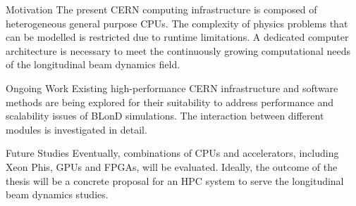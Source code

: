 \begin{frame}
	\begin{block}{Motivation}
		The present CERN computing infrastructure is composed of heterogeneous general purpose CPUs. The complexity of physics problems that can be modelled is restricted due to runtime limitations. A dedicated computer architecture is necessary to meet the continuously growing computational needs of the longitudinal beam dynamics field.
	\end{block}

	\begin{block}{Ongoing Work}
		Existing high-performance CERN infrastructure and software methods are being explored for their suitability to address performance and scalability issues of BLonD simulations. The interaction between different modules is investigated in detail.
	\end{block}

	\begin{block}{Future Studies}
		Eventually, combinations of CPUs and accelerators, including Xeon Phis, GPUs and FPGAs,  will be evaluated. Ideally, the outcome of the thesis will be a concrete proposal for an HPC system to serve the longitudinal beam dynamics studies. 
	\end{block}
\end{frame}



